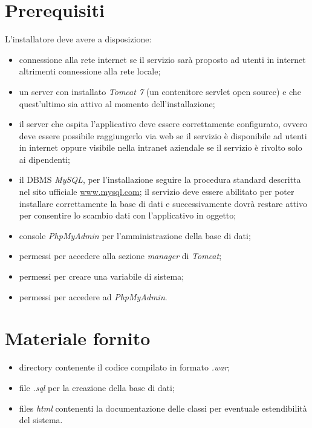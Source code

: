 \section{Prerequisiti}
L'installatore deve avere a disposizione:
\begin{itemize}
	\item connessione alla rete internet se il servizio sarà proposto ad utenti in internet altrimenti connessione alla rete locale;
	\item un server con installato \textit{Tomcat 7} (un contenitore servlet open source) e che 		quest'ultimo sia attivo al momento dell'installazione;
	\item il server che ospita l'applicativo deve essere correttamente configurato, ovvero deve essere possibile raggiungerlo via web se il servizio è disponibile ad utenti in internet oppure visibile nella intranet aziendale se il servizio è rivolto solo ai dipendenti;
	\item il DBMS \textit{MySQL}, per l'installazione seguire la procedura standard descritta nel sito ufficiale \url{www.mysql.com}; il servizio deve essere abilitato per poter installare correttamente la base di dati e successivamente dovrà restare attivo per consentire lo scambio dati con l'applicativo in oggetto;
	\item console \textit{PhpMyAdmin} per l'amministrazione della base di dati;
	\item permessi per accedere alla sezione \textit{manager} di \textit{Tomcat};
	\item permessi per creare una variabile di sistema;
	\item permessi per accedere ad \textit{PhpMyAdmin}.
\end{itemize} 

\section{Materiale fornito}
\begin{itemize}
\item directory \caName{} contenente il codice compilato in formato \textit{.war};
\item file \textit{.sql} per la creazione della base di dati;
\item files \textit{html} contenenti la documentazione delle classi per eventuale estendibilità del sistema.
\end{itemize} 

